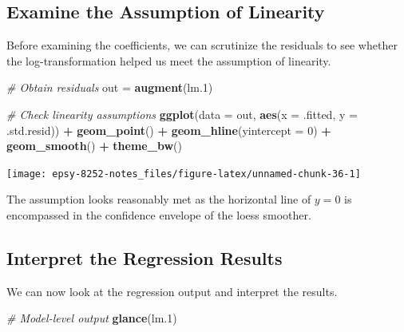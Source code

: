 \documentclass[]{book}
\newenvironment{Shaded}{\begin{snugshade}}{\end{snugshade}}
\newcommand{\CommentTok}[1]{\textcolor[rgb]{0.56,0.35,0.01}{\textit{#1}}}
\newcommand{\DataTypeTok}[1]{\textcolor[rgb]{0.13,0.29,0.53}{#1}}
\newcommand{\DecValTok}[1]{\textcolor[rgb]{0.00,0.00,0.81}{#1}}
\newcommand{\FloatTok}[1]{\textcolor[rgb]{0.00,0.00,0.81}{#1}}
\newcommand{\KeywordTok}[1]{\textcolor[rgb]{0.13,0.29,0.53}{\textbf{#1}}}
\newcommand{\NormalTok}[1]{#1}
\newcommand{\OperatorTok}[1]{\textcolor[rgb]{0.81,0.36,0.00}{\textbf{#1}}}
\newcommand{\StringTok}[1]{\textcolor[rgb]{0.31,0.60,0.02}{#1}}
\begin{document}
\hypertarget{examine-the-assumption-of-linearity}{%
\subsection{Examine the Assumption of Linearity}\label{examine-the-assumption-of-linearity}}

Before examining the coefficients, we can scrutinize the residuals to see whether the log-transformation helped us meet the assumption of linearity.

\begin{Shaded}
\begin{Highlighting}[]
\CommentTok{# Obtain residuals}
\NormalTok{out =}\StringTok{ }\KeywordTok{augment}\NormalTok{(lm}\FloatTok{.1}\NormalTok{)}

\CommentTok{# Check linearity assumptions}
\KeywordTok{ggplot}\NormalTok{(}\DataTypeTok{data =}\NormalTok{ out, }\KeywordTok{aes}\NormalTok{(}\DataTypeTok{x =}\NormalTok{ .fitted, }\DataTypeTok{y =}\NormalTok{ .std.resid)) }\OperatorTok{+}
\StringTok{  }\KeywordTok{geom_point}\NormalTok{() }\OperatorTok{+}
\StringTok{  }\KeywordTok{geom_hline}\NormalTok{(}\DataTypeTok{yintercept =} \DecValTok{0}\NormalTok{) }\OperatorTok{+}
\StringTok{  }\KeywordTok{geom_smooth}\NormalTok{() }\OperatorTok{+}
\StringTok{  }\KeywordTok{theme_bw}\NormalTok{()}
\end{Highlighting}
\end{Shaded}

\begin{center}\texttt{[image: epsy-8252-notes\_files/figure-latex/unnamed-chunk-36-1]} \end{center}

The assumption looks reasonably met as the horizontal line of \(y=0\) is encompassed in the confidence envelope of the loess smoother.

\hypertarget{interpret-the-regression-results}{%
\subsection{Interpret the Regression Results}\label{interpret-the-regression-results}}

We can now look at the regression output and interpret the results.

\begin{Shaded}
\begin{Highlighting}[]
\CommentTok{# Model-level output}
\KeywordTok{glance}\NormalTok{(lm}\FloatTok{.1}\NormalTok{)}
\end{Highlighting}
\end{Shaded}
\end{document}
